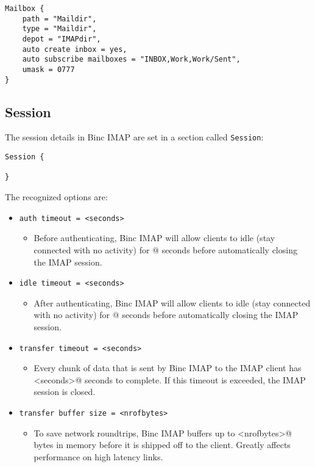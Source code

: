 \documentclass[11pt,a4paper,twoside,openright]{report}
\begin{document}
\begin{Verbatim}
Mailbox {
    path = "Maildir",
    type = "Maildir",
    depot = "IMAPdir",
    auto create inbox = yes,
    auto subscribe mailboxes = "INBOX,Work,Work/Sent",
    umask = 0777
}
\end{Verbatim}

\subsection{Session}

The session details in Binc IMAP are set in a section called \texttt{Session}:

\begin{Verbatim}
Session {

}
\end{Verbatim}
The recognized options are:

\begin{itemize}

\item \texttt{auth timeout = <seconds>}
  \begin{itemize}
    \item [] Before authenticating, Binc IMAP will allow clients to
      idle (stay connected with no activity) for @
      seconds before automatically closing the IMAP session.
  \end{itemize}

\item \texttt{idle timeout = <seconds>}
  \begin{itemize}
    \item [] After authenticating, Binc IMAP will allow clients to
      idle (stay connected with no activity) for @
      seconds before automatically closing the IMAP session.
  \end{itemize}

\item \texttt{transfer timeout = <seconds>}
  \begin{itemize}
    \item [] Every chunk of data that is sent by Binc IMAP to the IMAP
      client has \Verb@<seconds>@ seconds to complete. If this timeout
      is exceeded, the IMAP session is closed.
  \end{itemize}

\item \texttt{transfer buffer size = <nrofbytes>}
  \begin{itemize}
    \item [] To save network roundtrips, Binc IMAP buffers up to
      \Verb@<nrofbytes>@ bytes in memory before it is shipped off to
      the client. Greatly affects performance on high latency links.
  \end{itemize}
\end{itemize}
\end{document}
